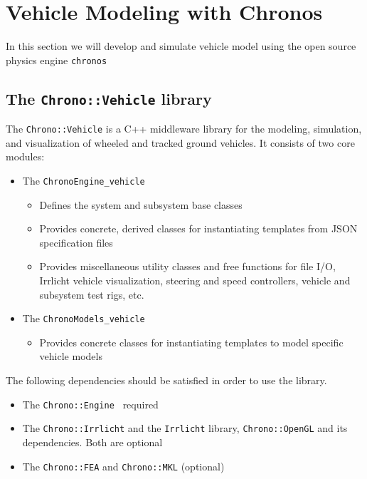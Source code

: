 \section{Vehicle Modeling with Chronos}
\label{vehicle_modeling_chronos}

In this section we will develop and simulate vehicle model using the open source physics engine \lstinline{chronos} 


\subsection{The \lstinline{Chrono::Vehicle} library}

The \lstinline{Chrono::Vehicle} is a C++ middleware library for the modeling, simulation, and visualization of wheeled and tracked ground vehicles.
It consists of two core modules:

\begin{itemize}
\item The \lstinline{ChronoEngine_vehicle}

	\begin{itemize}
		\item Defines the system and subsystem base classes
		\item Provides concrete, derived classes for instantiating templates from JSON specification files
		\item Provides miscellaneous utility classes and free functions for file I/O, Irrlicht vehicle visualization, steering and speed controllers, vehicle and subsystem test rigs, etc.
	\end{itemize}

\item The \lstinline{ChronoModels_vehicle}
	\begin{itemize}
		\item Provides concrete classes for instantiating templates to model specific vehicle models
	\end{itemize}
\end{itemize}

The following dependencies should be satisfied in order to use the library.

\begin{itemize}
\item The \lstinline{Chrono::Engine } required
\item The \lstinline{Chrono::Irrlicht} and the \lstinline{Irrlicht} library,  \lstinline{Chrono::OpenGL} and its dependencies. Both are optional
\item The \lstinline{Chrono::FEA} and \lstinline{Chrono::MKL} (optional)
\end{itemize}


